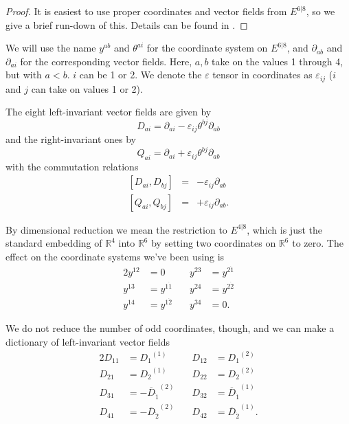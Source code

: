 \documentclass[twoside]{amsart}
\newcommand{\RR}{\ensuremath{\mathbb{R}}}
\renewcommand{\epsilon}{\varepsilon}
\newcommand{\enm}[1]{\ensuremath{#1}}
\newcommand{\superijk}[3]{\enm{{#1}^{#2|#3}}}
\newcommand{\rrij}[2]{\superijk{E}{#1}{#2}}
\renewcommand{\bar}[1]{\overline{#1}}
\newcommand{\di}[1]{\enm{\partial_{#1}}}
\newcommand{\cjsub}[2]{\enm{\bar#1{} _{{\dot{#2 }}}}} %
\newcommand{\odi}[1]{\enm{D_{#1}}}
\newcommand{\odicj}[1]{\enm{\cjsub{D}{#1}}}
\newcommand{\oqi}[1]{\enm{Q_{#1}}}
\newcommand{\even}[3]{\enm{{#1}^{#2 \dot{#3}}}}
\newcommand{\onetwoij}[2]{\enm{#1^{(#2)}}}
\renewcommand{\epsilon}{\varepsilon}
\newcommand{\susols}{\cite{susols}}
\begin{document}
\begin{proof}
It is easiest to use proper coordinates and vector fields from
\rrij{6}{8}, so we give a brief run-down of this.  Details can be
found in \susols.
\end{proof}

We will use the name \( y^{ab} \) and \( \theta^{ai} \) for the
coordinate system on \rrij{6}{8}, and \( \di{ab} \) and \(
\di{ai} \) for the corresponding vector fields.  Here, \( a, b \)
take
on the values 1 through 4, but with \( a<b \).  \( i \) can be 1 or
2. We denote the \(\epsilon\) tensor in coordinates as
\(\epsilon_{ij}\) (\( i \) and \( j \) can take on values 1 or 2).

The eight left-invariant vector fields are given by
\begin{equation}
    \odi{ai} = \di{ai} - \epsilon_{ij}\theta^{bj}\di{ab}
    \label{eq:defofdinm68}
\end{equation}
and the right-invariant ones by
\begin{equation}
    \oqi{ai} = \di{ai} + \epsilon_{ij}\theta^{bj}\di{ab}
    \label{eq:defofqinm68}
\end{equation}
with the commutation relations
\begin{eqnarray*}
    \left[\odi{ai}, \odi{bj}\right] & = & -\epsilon_{ij}\di{ab}  \\
    \left[\oqi{ai}, \oqi{bj}\right] & = & +\epsilon_{ij}\di{ab}.
\end{eqnarray*}

By dimensional reduction we mean the restriction to \rrij{4}{8},
which is just the standard embedding of \(\RR^4\) into \(\RR^6\) by
setting two coordinates on \(\RR^6\) to
zero.  The effect on the coordinate systems we've been using is
\begin{alignat}{2}
    y^{12} & = 0
    & \quad y^{23} & = \even{y}{2}{1}\nonumber\\
    y^{13} & = \even{y}{1}{1}
    & \quad y^{24} & = \even{y}{2}{2}\label{eq:dimred2}\\
    y^{14} & = \even{y}{1}{2}
    & \quad y^{34} & = 0.\nonumber
\end{alignat}

We do not reduce the number of odd coordinates, though, and we can
make a dictionary of left-invariant vector fields
\begin{alignat}{2}
    D_{11} & = \onetwoij{\odi{1}}{1}
    & \quad D_{12} & = \onetwoij{\odi{1}}{2}\nonumber\\
    D_{21} & = \onetwoij{\odi{2}}{1}
    & \quad D_{22} & = \onetwoij{\odi{2}}{2} \label{eq:dimred}\\
    D_{31} & = -\onetwoij{\odicj{1}}{2}
    & \quad D_{32} & = \onetwoij{\odicj{1}}{1}\nonumber\\
    D_{41} & = -\onetwoij{\odicj{2}}{2}
    & \quad D_{42} & = \onetwoij{\odicj{2}}{1}\nonumber.
\end{alignat}
\end{document}
